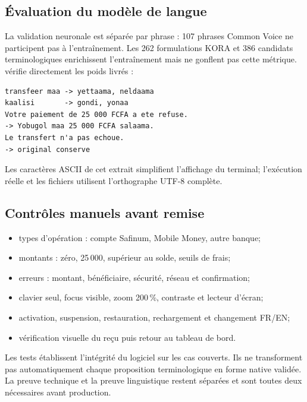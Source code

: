 \subsection{Évaluation du modèle de langue}

La validation neuronale est séparée par phrase : 107 phrases Common Voice ne
participent pas à l’entraînement. Les 262 formulations KORA et 386 candidats
terminologiques enrichissent l’entraînement mais ne gonflent pas cette
métrique.  vérifie directement les poids livrés :

\begin{lstlisting}[language={}]
transfeer maa -> yettaama, neldaama
kaalisi       -> gondi, yonaa
Votre paiement de 25 000 FCFA a ete refuse.
-> Yobugol maa 25 000 FCFA salaama.
Le transfert n'a pas echoue.
-> original conserve
\end{lstlisting}

Les caractères ASCII de cet extrait simplifient l’affichage du terminal;
l’exécution réelle et les fichiers utilisent l’orthographe UTF-8 complète.

\subsection{Contrôles manuels avant remise}

\begin{itemize}
  \item types d’opération : compte Safinum, Mobile Money, autre banque;
  \item montants : zéro, 25\,000, supérieur au solde, seuils de frais;
  \item erreurs : montant, bénéficiaire, sécurité, réseau et confirmation;
  \item clavier seul, focus visible, zoom 200\,\%, contraste et lecteur d’écran;
  \item activation, suspension, restauration, rechargement et changement
        FR/EN;
  \item vérification visuelle du reçu puis retour au tableau de bord.
\end{itemize}

\begin{warningbox}
Les tests établissent l’intégrité du logiciel sur les cas couverts. Ils ne
transforment pas automatiquement chaque proposition terminologique en forme
native validée. La preuve technique et la preuve linguistique restent
séparées et sont toutes deux nécessaires avant production.
\end{warningbox}
